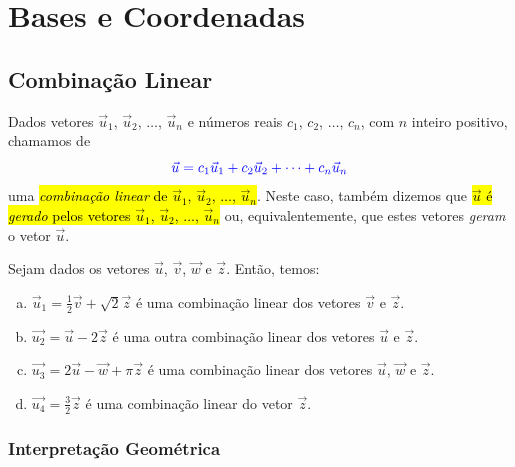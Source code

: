 
\chapter{Bases e Coordenadas}\label{cap_base}

\section{Combinação Linear}\label{cap_base_sec_comblin}

Dados vetores $\vec{u}_1$, $\vec{u}_2$, $\dotsc$, $\vec{u}_n$ e números reais $c_1$, $c_2$, $\dotsc$, $c_n$, com $n$ inteiro positivo, chamamos de
\begin{equation}
  {\color{blue}\vec{u} = c_1\vec{u}_1 + c_2\vec{u}_2 + \cdots + c_n\vec{u}_n}
\end{equation}
uma \hl{\emph{combinação linear} de $\vec{u}_1$, $\vec{u}_2$, $\dotsc$, $\vec{u}_n$}. Neste caso, também dizemos que \hl{$\vec{u}$ é \emph{gerado} pelos vetores $\vec{u}_1$, $\vec{u}_2$, $\dotsc$, $\vec{u}_n$} ou, equivalentemente, que estes vetores \emph{geram} o vetor $\vec{u}$.

\begin{ex}\label{cap_base_sec_comblin:ex:comblinear}
  Sejam dados os vetores $\vec{u}$, $\vec{v}$, $\vec{w}$ e $\vec{z}$. Então, temos:
  \begin{enumerate}[a)]
  \item $\vec{u}_1 = \frac{1}{2}\vec{v} + \sqrt{2}\vec{z}$ é uma combinação linear dos vetores $\vec{v}$ e $\vec{z}$.
  \item $\vec{u_2} = \vec{u} - 2\vec{z}$ é uma outra combinação linear dos vetores $\vec{u}$ e $\vec{z}$.
  \item $\vec{u_3} = 2\vec{u} - \vec{w} + \pi\vec{z}$ é uma combinação linear dos vetores $\vec{u}$, $\vec{w}$ e $\vec{z}$.
  \item $\vec{u_4} = \frac{3}{2}\vec{z}$ é uma combinação linear do vetor $\vec{z}$.
  \end{enumerate}
\end{ex}

\subsection{Interpretação Geométrica}

